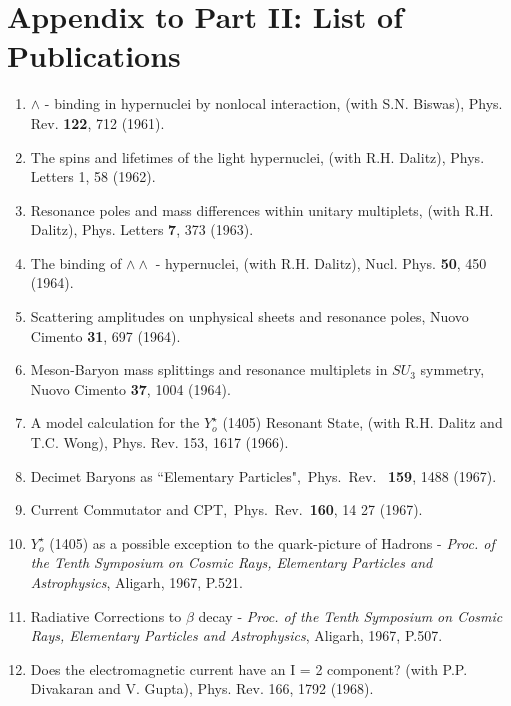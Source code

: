 \chapter{Appendix to Part II: List of\\ Publications}

\begin{enumerate}
\itemsep=0pt
\item $\wedge$ - binding in hypernuclei by nonlocal interaction, (with
S.N. Biswas),  Phys. Rev. {\bf 122}, 712 (1961). 

\item The spins and lifetimes of the light hypernuclei, (with R.H.
Dalitz), Phys. Letters {1}, 58 (1962).

\item Resonance poles and mass differences within unitary multiplets, 
(with R.H. Dalitz), Phys. Letters {\bf 7}, 373 (1963).

\item The binding of $\wedge \wedge$ - hypernuclei, (with R.H. Dalitz), 
Nucl. Phys. {\bf 50}, 450 (1964).

\item Scattering amplitudes on unphysical sheets and resonance poles, 
Nuovo Cimento {\bf 31}, 697 (1964).

\item Meson-Baryon mass splittings and resonance multiplets in $SU_3$
symmetry, Nuovo Cimento {\bf 37}, 1004 (1964).

\item A model calculation for the $Y^\star_o$ (1405) Resonant State, 
(with R.H. Dalitz and T.C. Wong), Phys. Rev. 153, 1617 (1966).

\item Decimet Baryons as ``Elementary Particles",\ Phys.\ Rev.\ {\bf
159}, 1488 (1967).

\item Current Commutator and CPT,\ Phys.\ Rev.\ {\bf 160}, 14 27 (1967).

\item $Y^\star_o$ (1405) as a possible exception to the quark-picture of
Hadrons - {\it Proc. of the Tenth Symposium on Cosmic Rays, Elementary
Particles and Astrophysics}, Aligarh, 1967, P.521.
\newpage
\item Radiative Corrections to $\beta$ decay - {\it Proc. of the Tenth
Symposium on Cosmic Rays, Elementary Particles and Astrophysics}, 
Aligarh, 1967, P.507.

\item Does the electromagnetic current have an I = 2 component? (with
P.P. Divakaran and V. Gupta), Phys. Rev. 166, 1792 (1968).


\end{enumerate}
